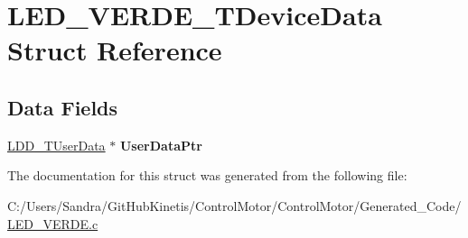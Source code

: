 \hypertarget{struct_l_e_d___v_e_r_d_e___t_device_data}{}\section{L\+E\+D\+\_\+\+V\+E\+R\+D\+E\+\_\+\+T\+Device\+Data Struct Reference}
\label{struct_l_e_d___v_e_r_d_e___t_device_data}
\subsection*{Data Fields}
\begin{DoxyCompactItemize}
\item 
\hyperlink{group___p_e___types__module_ga0b66a73f87238a782318aa0be7578e35}{L\+D\+D\+\_\+\+T\+User\+Data} $\ast$ {\bfseries User\+Data\+Ptr}\hypertarget{struct_l_e_d___v_e_r_d_e___t_device_data_a07dec101bb66ac6dd51f4c458b252cfa}{}\label{struct_l_e_d___v_e_r_d_e___t_device_data_a07dec101bb66ac6dd51f4c458b252cfa}

\end{DoxyCompactItemize}


The documentation for this struct was generated from the following file\+:\begin{DoxyCompactItemize}
\item 
C\+:/\+Users/\+Sandra/\+Git\+Hub\+Kinetis/\+Control\+Motor/\+Control\+Motor/\+Generated\+\_\+\+Code/\hyperlink{_l_e_d___v_e_r_d_e_8c}{L\+E\+D\+\_\+\+V\+E\+R\+D\+E.\+c}\end{DoxyCompactItemize}

